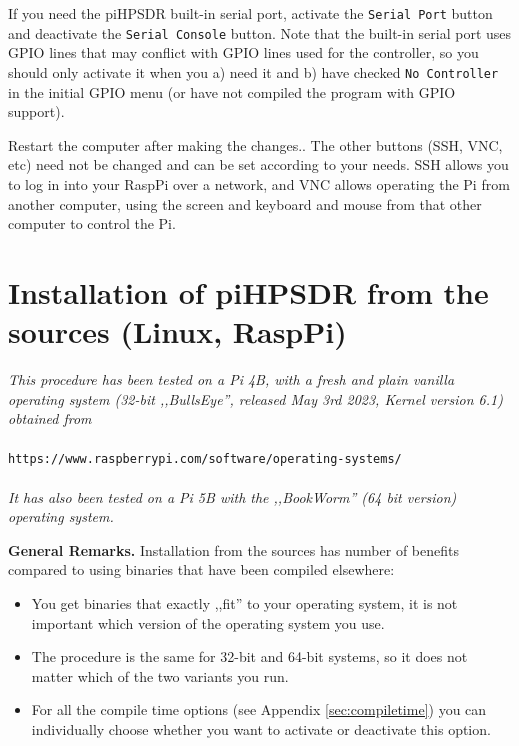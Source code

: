\documentclass[12pt]{book}
\def\rett#1{\texttt{\color{red}#1}}
\def\pH{pi\-HPSDR }
\begin{document}
If you need the \pH built-in serial port, activate the \rett{Serial Port} button and deactivate
the \rett{Serial Console} button. Note that the built-in serial port uses GPIO lines that may
conflict with GPIO lines used for the controller, so
you should only activate it when you a) need it and b) have checked \rett{No Controller} in the
initial GPIO menu (or have not compiled the program with GPIO support).

Restart the computer after making the changes..
The other buttons (SSH, VNC, etc) need not be changed and can be set according to your needs. SSH allows
you to log in into your RaspPi over a network, and VNC allows operating the Pi from another computer,
using the screen and keyboard and mouse from that other computer to control the Pi.

\chapter[Linux: piHPDSR install from sources]{Installation of \pH from the sources (Linux, RaspPi)}
\label{sec:installsources}
\textit{This procedure has been tested on a Pi 4B, with a fresh and plain vanilla operating
system (32-bit ,,BullsEye'', released May 3rd 2023, Kernel version 6.1) obtained from} \\
\\
\texttt{https://www.raspberrypi.com/software/operating-systems/} \\
\\
\textit{It has also been tested on a Pi 5B with the ,,BookWorm'' (64 bit version) operating system.}

\textbf{General Remarks.}
Installation from the sources has number of benefits compared to using binaries that have
been compiled elsewhere:

\begin{itemize}
\item{You get binaries that exactly ,,fit'' to your operating system, it is not important which version
of the operating system you use.}
\item{The procedure is the same for 32-bit and 64-bit systems, so it does not matter
which of the two variants you run.}
\item{For all the compile time options (see Appendix \ref{sec:compiletime}) you can individually choose
whether you want to activate or deactivate this option.}
\end{itemize}
\end{document}
